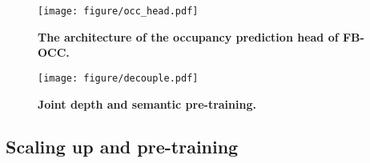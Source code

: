 \documentclass[10pt,twocolumn,letterpaper]{article}
\begin{document}
\begin{figure}[t]
\centering
\texttt{[image: figure/occ\_head.pdf]}
\vspace{-2mm}
\caption{\textbf{The architecture of the occupancy prediction head of FB-OCC.} 
}
\label{fig:head}
\vspace{-3mm}
\end{figure}


\begin{figure}[htb]
\centering
\texttt{[image: figure/decouple.pdf]}
\caption{\textbf{Joint depth and semantic pre-training.} 
}
\label{fig:decouple}
\vspace{-3mm}
\end{figure}


\subsection{Scaling up and pre-training}\label{SP}
\end{document}
